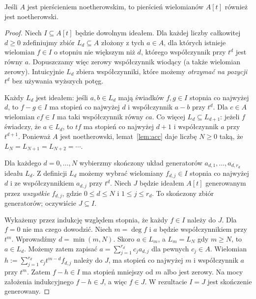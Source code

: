 \begin{twierdzenie}
\label{tw:hilbert-basis}
Jeśli $A$ jest pierścieniem noetherowskim, to pierścień wielomianów
$A[t]$ również jest noetherowski.
\end{twierdzenie}
\begin{proof}
Niech $I\subseteq A[t]$ będzie dowolnym ideałem.
Dla każdej liczby całkowitej $d\ge0$ zdefiniujmy zbiór
$L_d\subseteq A$ złożony z tych $a\in A$, dla których istnieje
wielomian $f\in I$ o stopniu nie większym niż $d$,
którego współczynnik przy $t^d$ jest równy $a$.
Dopuszczamy więc zerowy współczynnik wiodący (a także wielomian
zerowy). Intuicyjnie $L_d$ zbiera współczynniki, które możemy
\emph{otrzymać na pozycji $t^d$} bez używania wyższych potęg.

Każdy $L_d$ jest ideałem: jeśli $a,b\in L_d$ mają świadków
$f,g\in I$ stopnia co najwyżej $d$, to $f-g\in I$ ma stopień
co najwyżej $d$ i współczynnik $a-b$ przy $t^d$.
Dla $c\in A$ wielomian $cf\in I$ ma taki współczynnik równy $ca$.
Co więcej $L_d\subseteq L_{d+1}$: jeżeli $f$ świadczy, że
$a\in L_d$, to $tf$ ma stopień co najwyżej $d+1$ i współczynnik
$a$ przy $t^{d+1}$. Ponieważ $A$ jest noetherowski,
lemat~\ref{lem:acc} daje liczbę $N\ge0$ taką, że
$L_N=L_{N+1}=L_{N+2}=\cdots$.

Dla każdego $d=0,\dots,N$ wybierzmy skończony układ generatorów
$a_{d,1},\dots,a_{d,r_d}$ ideału $L_d$. Z definicji $L_d$
możemy wybrać wielomiany $f_{d,j}\in I$ stopnia co najwyżej $d$
i ze współczynnikiem $a_{d,j}$ przy $t^d$.
Niech $J$ będzie ideałem $A[t]$ generowanym przez \emph{wszystkie}
$f_{d,j}$, gdzie $0\le d\le N$ i $1\le j\le r_d$.
To skończony zbiór generatorów; oczywiście $J\subseteq I$.

Wykażemy przez indukcję względem stopnia, że każdy $f\in I$
należy do $J$. Dla $f=0$ nie ma czego dowodzić.
Niech $m=\deg f$ i $a$ będzie współczynnikiem przy $t^m$.
Wprowadźmy $d=\min(m,N)$.
Skoro $a\in L_m$, a $L_m=L_N$ gdy $m\ge N$,
to $a\in L_d$. Możemy zatem zapisać
$a=\sum_{j=1}^{r_d}c_ja_{d,j}$ dla pewnych $c_j\in A$.
Wielomian
$h:=\sum_{j=1}^{r_d}c_jt^{m-d}f_{d,j}$ należy do $J$,
ma stopień co najwyżej $m$ i współczynnik $a$ przy $t^m$.
Zatem $f-h\in I$ ma stopień mniejszy od $m$ albo jest zerowy.
Na mocy założenia indukcyjnego $f-h\in J$, a więc $f\in J$.
W rezultacie $I=J$ jest skończenie generowany.
\end{proof}

